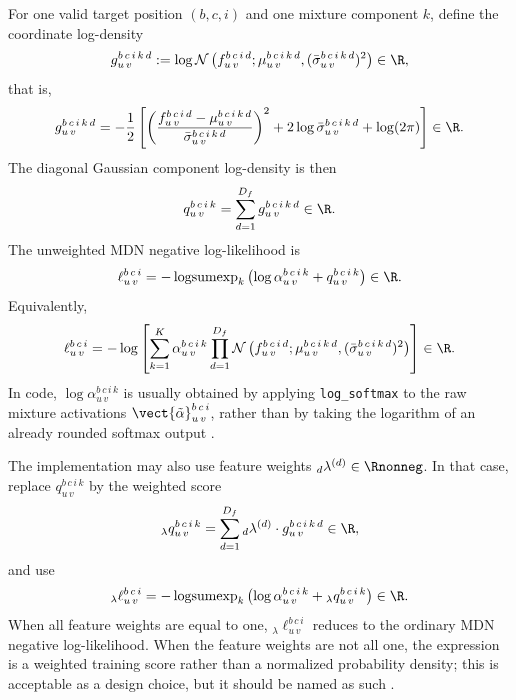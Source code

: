 For one valid target position $(b,c,i)$ and one mixture component $k$, define
the coordinate log-density
\[
  g_{u\,v}^{b\,c\,i\,k\,d}
  :=
  \log
  \mathcal{N}
  \left(
    f_{u\,v}^{b\,c\,i\,d};
    \mu_{u\,v}^{b\,c\,i\,k\,d},
    (\bar{\sigma}_{u\,v}^{b\,c\,i\,k\,d})^{2}
  \right)
  \in\R,
\]
that is,
\[
  g_{u\,v}^{b\,c\,i\,k\,d}
  =
  -\frac{1}{2}
  \left[
    \left(
      \frac{
        f_{u\,v}^{b\,c\,i\,d}-\mu_{u\,v}^{b\,c\,i\,k\,d}
      }{
        \bar{\sigma}_{u\,v}^{b\,c\,i\,k\,d}
      }
    \right)^{2}
    +
    2\log \bar{\sigma}_{u\,v}^{b\,c\,i\,k\,d}
    +
    \log(2\pi)
  \right]
  \in\R.
\]
The diagonal Gaussian component log-density is then
\[
  q_{u\,v}^{b\,c\,i\,k}
  =
  \sum_{d=1}^{D_f} g_{u\,v}^{b\,c\,i\,k\,d}
  \in\R.
\]
The unweighted MDN negative log-likelihood is
\[
  \ell_{u\,v}^{b\,c\,i}
  =
  -
  \operatorname{logsumexp}_{k}
  \left(
    \log \alpha_{u\,v}^{b\,c\,i\,k}
    +
    q_{u\,v}^{b\,c\,i\,k}
  \right)
  \in\R.
\]
Equivalently,
\[
  \ell_{u\,v}^{b\,c\,i}
  =
  -
  \log
  \left[
    \sum_{k=1}^{K}
    \alpha_{u\,v}^{b\,c\,i\,k}
    \prod_{d=1}^{D_f}
    \mathcal{N}
    \left(
      f_{u\,v}^{b\,c\,i\,d};
      \mu_{u\,v}^{b\,c\,i\,k\,d},
      (\bar{\sigma}_{u\,v}^{b\,c\,i\,k\,d})^{2}
    \right)
  \right]
  \in\R.
\]
In code, $\log\alpha_{u\,v}^{b\,c\,i\,k}$ is usually obtained by applying
\texttt{log\_softmax} to the raw mixture activations
$\vect{\tilde{\alpha}}_{u\,v}^{b\,c\,i}$, rather than by taking the logarithm of an
already rounded softmax output%
.

The implementation may also use feature weights
${}_{d}\lambda^{(d)}\in\Rnonneg$.  In that case, replace $q_{u\,v}^{b\,c\,i\,k}$ by the
weighted score
\[
  {}_{\lambda}q_{u\,v}^{b\,c\,i\,k}
  =
  \sum_{d=1}^{D_f}
  {}_{d}\lambda^{(d)}\cdot g_{u\,v}^{b\,c\,i\,k\,d}
  \in\R,
\]
and use
\[
  {}_{\lambda}\ell_{u\,v}^{b\,c\,i}
  =
  -
  \operatorname{logsumexp}_{k}
  \left(
    \log \alpha_{u\,v}^{b\,c\,i\,k}
    +
    {}_{\lambda}q_{u\,v}^{b\,c\,i\,k}
  \right)
  \in\R.
\]
When all feature weights are equal to one,
${}_{\lambda}\ell_{u\,v}^{b\,c\,i}$ reduces to the ordinary MDN negative
log-likelihood.  When the feature weights are not all one, the expression is a
weighted training score rather than a normalized probability density; this is
acceptable as a design choice, but it should be named as such%
.

